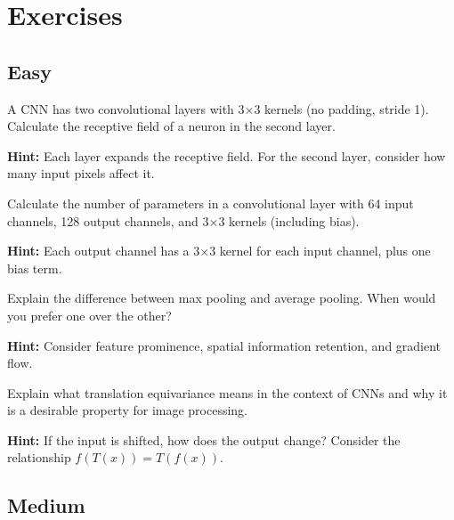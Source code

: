 
\section*{Exercises}

\subsection*{Easy}

\begin{problem}
A CNN has two convolutional layers with 3×3 kernels (no padding, stride 1). Calculate the receptive field of a neuron in the second layer.

\textbf{Hint:} Each layer expands the receptive field. For the second layer, consider how many input pixels affect it.
\end{problem}

\begin{problem}
Calculate the number of parameters in a convolutional layer with 64 input channels, 128 output channels, and 3×3 kernels (including bias).

\textbf{Hint:} Each output channel has a 3×3 kernel for each input channel, plus one bias term.
\end{problem}

\begin{problem}
Explain the difference between max pooling and average pooling. When would you prefer one over the other?

\textbf{Hint:} Consider feature prominence, spatial information retention, and gradient flow.
\end{problem}

\begin{problem}
Explain what translation equivariance means in the context of CNNs and why it is a desirable property for image processing.

\textbf{Hint:} If the input is shifted, how does the output change? Consider the relationship $f(T(x)) = T(f(x))$.
\end{problem}

\subsection*{Medium}


